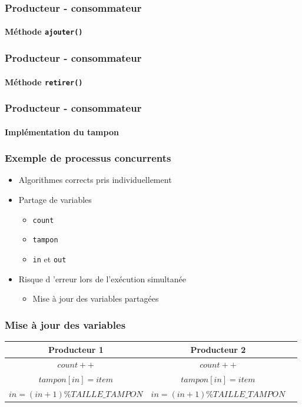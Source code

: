 \begin{frame}
\frametitle{Producteur - consommateur}
\framesubtitle{Méthode \texttt{ajouter()}}
\begin{scriptsize}\end{scriptsize}
\end{frame}

\begin{frame}
\frametitle{Producteur - consommateur}
\framesubtitle{Méthode \texttt{retirer()}}
\begin{scriptsize}\end{scriptsize}
\end{frame}

\begin{frame}
\frametitle{Producteur - consommateur}
\framesubtitle{Implémentation du tampon}
\begin{scriptsize}\end{scriptsize}
\end{frame}

\begin{frame}
\frametitle{Exemple de processus concurrents}
\begin{itemize}
\item Algorithmes corrects pris individuellement
\item Partage de variables
\begin{itemize}
\item \texttt{count}
\item \texttt{tampon}
\item \texttt{in} et \texttt{out}
\end{itemize}
\item Risque d ’erreur lors de l’exécution simultanée
\begin{itemize}
\item Mise à jour des variables partagées
\end{itemize}
\end{itemize}
\end{frame}

\begin{frame}
\frametitle{Mise à jour des variables}
\begin{center}
\begin{tabular}{|c|c|c|}
\hline
Producteur 1 & Producteur 2 \\
\hline
  $count++$ & $count++$ \\ 
  $tampon[in] = item$ & $tampon[in] = item$ \\
  $in = (in + 1) \% TAILLE\_TAMPON$ & $in = (in + 1) \% TAILLE\_TAMPON$ \\
\hline
\end{tabular}
\end{center}
\end{frame}


